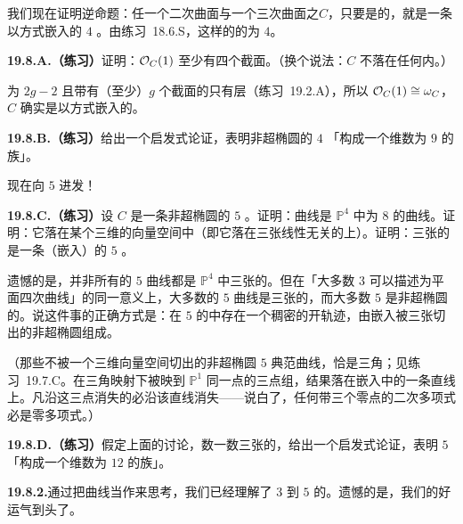 我们现在证明逆命题：任一个二次曲面与一个三次曲面之\trCompleteIntersection{}$C$，只要是\trRegular{}的，就是一条以\trCanonical{}方式嵌入的\trGenus{} $4$ \trCurve。由\mbox{练习~18.6.S}，这样的\trCompleteIntersection{}的\trGenus{}为 $4$。

\textbf{19.8.A.（练习）}\quad 证明：$\mathcal{O}_C(1)$ 至少有四个截面。（换个说法：$C$ 不落在任何\trHyperplane{}内。）

\trDegree{}为 $2g-2$ 且带有（至少）$g$ 个截面的\trInvertibleSheaf{}只有\trCanonical{}层（\mbox{练习~19.2.A}），所以 $\mathcal{O}_C(1)\cong\omega_C$，$C$ 确实是以\trCanonical{}方式嵌入的。

\textbf{19.8.B.（练习）}\quad 给出一个启发式论证，表明非超椭圆的\trGenus{} $4$ \trCurve{}「构成一个维数为 $9$ 的族」。

现在向\trGenus{} $5$ 进发！

\textbf{19.8.C.（练习）}\quad 设 $C$ 是一条非超椭圆的\trGenus{} $5$ \trCurve。证明：\trCanonical{}曲线是 $\mathbb{P}^4$ 中\trDegree{}为 $8$ 的曲线。证明：它落在某个三维的\trQuadricSurface{}向量空间中（即它落在三张线性无关的\trQuadricSurface{}上）。证明：三张\trQuadricSurface{}的\trRegular{}\trCompleteIntersection{}是一条\trCanonical{}（嵌入）的\trGenus{} $5$ \trCurve。

遗憾的是，并非所有\trCanonical{}的\trGenus{} $5$ 曲线都是 $\mathbb{P}^4$ 中三张\trQuadricSurface{}的\trCompleteIntersection。但在「大多数\trGenus{} $3$ \trCurve{}可以描述为平面四次曲线」的同一意义上，大多数\trCanonical{}的\trGenus{} $5$ 曲线是三张\trQuadricSurface{}的\trCompleteIntersection，而大多数\trGenus{} $5$ \trCurve{}是非超椭圆的。说这件事的正确方式是：在\trGenus{} $5$ \trCurve{}的\trModuliSpace{}中存在一个稠密的\trZariski{}开轨迹，由\trCanonical{}嵌入被三张\trQuadricSurface{}切出的非超椭圆\trCurve{}组成。

（那些不被一个三维\trQuadricSurface{}向量空间切出的非超椭圆\trGenus{} $5$ 典范曲线，恰是三角\trCurve；见\mbox{练习~19.7.C}。在三角映射下被映到 $\mathbb{P}^1$ 同一点的三点组，结果落在\trCanonical{}嵌入中的一条直线上。凡沿这三点消失的\trQuadricSurface{}必沿该直线消失——说白了，任何带三个零点的二次多项式必是零多项式。）

\textbf{19.8.D.（练习）}\quad 假定上面的讨论，数一数三张\trQuadricSurface{}的\trCompleteIntersection，给出一个启发式论证，表明\trGenus{} $5$ \trCurve{}「构成一个维数为 $12$ 的族」。

\textbf{19.8.2.}\quad 通过把\trCanonical{}曲线当作\trCompleteIntersection{}来思考，我们已经理解了\trGenus{} $3$ 到 $5$ 的\trCurve。遗憾的是，我们的好运气到头了。

